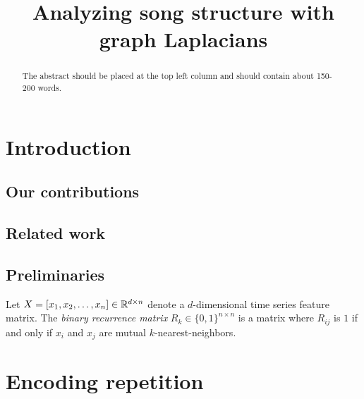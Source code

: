 \documentclass{article}
\title{Analyzing song structure with graph Laplacians}
\begin{document}
%
\maketitle
%
\begin{abstract}
The abstract should be placed at the top left column and should contain about 150-200 words.
\end{abstract}
%
\section{Introduction}\label{sec:introduction}

\subsection{Our contributions}

\subsection{Related work}

\cite{chung1997spectral, von2007tutorial}

\cite{serra2012unsupervised}

\cite{grohganz2013converting}

\subsection{Preliminaries}
Let $X = [x_1, x_2, \dots, x_n] \in \mathbb{R}^{d\times n}$ denote a $d$-dimensional time
series feature matrix.  The \emph{binary recurrence matrix} $R_k \in \{0,1\}^{n\times
n}$ is a matrix where $R_{ij}$ is $1$ if and only if $x_i$ and $x_j$ are mutual 
$k$-nearest-neighbors.

\section{Encoding repetition}


\end{document}
